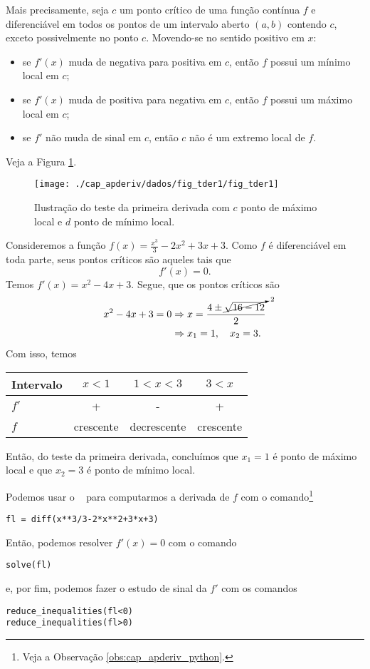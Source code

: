 Mais precisamente, seja $c$ um ponto crítico de uma função contínua $f$ e diferenciável em todos os pontos de um intervalo aberto $(a, b)$ contendo $c$, exceto possivelmente no ponto $c$. Movendo-se no sentido positivo em $x$:
\begin{itemize}
\item se $f'(x)$ muda de negativa para positiva em $c$, então $f$ possui um mínimo local em $c$;
\item se $f'(x)$ muda de positiva para negativa em $c$, então $f$ possui um máximo local em $c$;
\item se $f'$ não muda de sinal em $c$, então $c$ não é um extremo local de $f$.
\end{itemize}
Veja a Figura \ref{fig:tder1}.

\begin{figure}[H]
  \centering
  \texttt{[image: ./cap\_apderiv/dados/fig\_tder1/fig\_tder1]}
  \caption{Ilustração do teste da primeira derivada com $c$ ponto de máximo local e $d$ ponto de mínimo local.}
  \label{fig:tder1}
\end{figure}

\begin{ex}
  Consideremos a função $\displaystyle f(x)=\frac{x^3}{3}-2x^2+3x+3$. Como $f$ é diferenciável em toda parte, seus pontos críticos são aqueles tais que
  \begin{equation}
    f'(x)=0.
  \end{equation}
  Temos $f'(x) = x^2 - 4x + 3$. Segue, que os pontos críticos são
  \begin{align}
    x^2-4x+3=0 &\Rightarrow x = \frac{4\pm \cancelto{2}{\sqrt{16-12}}}{2} \\
    &\Rightarrow x_1 = 1,\quad x_2=3.
  \end{align}
  Com isso, temos
  \begin{center}
  \begin{tabular}{lccc}\hline
    Intervalo & $x<1$ & $1<x<3$ & $3<x$ \\\hline
    $f'$ & + & - & + \\
    $f$ & crescente & decrescente & crescente\\\hline
  \end{tabular}
\end{center}
  Então, do teste da primeira derivada, concluímos que $x_1=1$ é ponto de máximo local e que $x_2=3$ é ponto de mínimo local.

  \ifispython
  Podemos usar o \sympy~ para computarmos a derivada de $f$ com o comando\footnote{Veja a Observação \ref{obs:cap_apderiv_python}.}
\begin{verbatim}
fl = diff(x**3/3-2*x**2+3*x+3)
\end{verbatim}
  Então, podemos resolver $f'(x)=0$ com o comando
\begin{verbatim}
solve(fl)
\end{verbatim}
  e, por fim, podemos fazer o estudo de sinal da $f'$ com os comandos
\begin{verbatim}
reduce_inequalities(fl<0)
reduce_inequalities(fl>0)
\end{verbatim}
  \fi
\end{ex}

